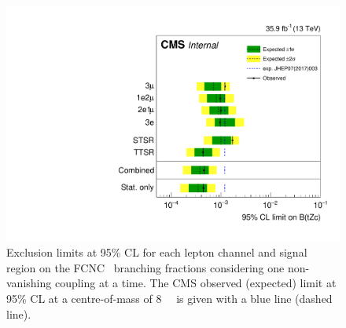 \begin{figure}[htbp]
	\centering
	\includegraphics[width=1.\linewidth]{6_Search/Figures/TOP-17-017_limitsZctStat.pdf}
	\caption{Exclusion limits at 95\% CL for each lepton channel and signal region on the FCNC \Zct\ branching fractions considering one non-vanishing coupling at a time. The CMS observed (expected) limit at 95\% CL at a centre-of-mass of 8~\TeV~\cite{Sirunyan:2017kkr} is given with a blue line (dashed line).}	
	\label{fig:exclusionlimitbrcompc}
\end{figure}


